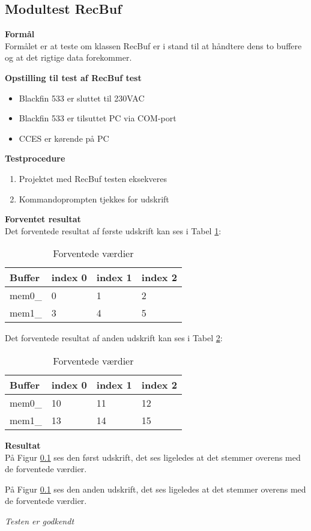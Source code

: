 \subsection{Modultest RecBuf}

\textbf{Formål} \\
Formålet er at teste om klassen RecBuf er i stand til at håndtere dens to buffere og at det rigtige data forekommer. 

\textbf{Opstilling til test af RecBuf test}

\begin{itemize}
	\item Blackfin 533 er sluttet til 230VAC
	\item Blackfin 533 er tilsuttet PC via COM-port
	\item CCES er kørende på PC
\end{itemize}

\textbf{Testprocedure}
\begin{enumerate}
	\item Projektet med RecBuf testen eksekveres 
	\item Kommandoprompten tjekkes for udskrift 
\end{enumerate}

\textbf{Forventet resultat} \\
Det forventede resultat af første udskrift kan ses i Tabel \ref{IL:modultest:values1}:

\begin{table}[H]
	\caption{Forventede værdier }
\begin{center}
    \begin{tabular}{ | l | l | l | l |}
    \hline 
    \textbf{Buffer} 	& \textbf{index 0}  &\textbf{index 1}	&\textbf{index 2}  	\\ \hline
     mem0\_	 	& 0   				& 1				& 2			\\ \hline
     mem1\_ 	& 3  				& 4 			& 5				\\ \hline
    \end{tabular}
\end{center}
	\label{IL:modultest:values1}
\end{table}

Det forventede resultat af anden udskrift kan ses i Tabel \ref{IL:modultest:values2}:

\begin{table}[H]
	\caption{Forventede værdier }
\begin{center}
    \begin{tabular}{ | l | l | l | l |}
    \hline 
    \textbf{Buffer} 	& \textbf{index 0}  &\textbf{index 1}	&\textbf{index 2}  	\\ \hline
     mem0\_	 	& 10   				& 11				& 12			\\ \hline
     mem1\_ 	& 13  				& 14 			& 15				\\ \hline
    \end{tabular}
\end{center}
	\label{IL:modultest:values2}
\end{table}

\textbf{Resultat} \\

På Figur \ref{} ses den først udskrift, det ses ligeledes at det stemmer overens med de forventede værdier.

På Figur \ref{} ses den anden udskrift, det ses ligeledes at det stemmer overens med de forventede værdier.  


\textit{Testen er godkendt}




